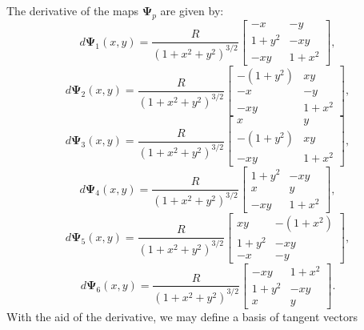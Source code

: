 The derivative of the maps $\boldsymbol{\Psi}_p$ are given by:
\begin{equation*}
	d\boldsymbol{\Psi}_{1}(x,y) = \frac{R}{{(1 + x^2 + y^2)}^{3/2}}
	\begin{bmatrix}
		-x & -y \\
	 	 1+y^2  & -xy \\
		 -xy  & 1+x^2
	\end{bmatrix},
\end{equation*}
\begin{equation*}
	d\boldsymbol{\Psi}_{2}(x,y) = \frac{R}{{(1 + x^2 + y^2)}^{3/2}}
	\begin{bmatrix}
		-(1+y^2) & xy \\
		 -x &  -y \\
		 -xy &  1+x^2
	\end{bmatrix},
\end{equation*}
\begin{equation*}
	d\boldsymbol{\Psi}_{3}(x,y) = \frac{R}{{(1 + x^2 + y^2)}^{3/2}}
	\begin{bmatrix}
		 x &  y \\
		-(1+y^2) & xy \\
		 -xy &  1+x^2
	\end{bmatrix},
\end{equation*}
\begin{equation*}
	d\boldsymbol{\Psi}_{4}(x,y) = \frac{R}{{(1 + x^2 + y^2)}^{3/2}}	
	\begin{bmatrix}
		 1+y^2 &  -xy \\
		 x & y \\
		 -xy &  1+x^2
	\end{bmatrix},
\end{equation*}
\begin{equation*}
	d\boldsymbol{\Psi}_{5}(x,y) = \frac{R}{{(1 + x^2 + y^2)}^{3/2}}	
	\begin{bmatrix}
		 xy  & -(1+x^2) \\
	 	 1+y^2  &  -xy \\
		-x & -y
	\end{bmatrix},
\end{equation*}
\begin{equation*}
	d\boldsymbol{\Psi}_{6}(x,y) = \frac{R}{{(1 + x^2 + y^2)}^{3/2}}
	\begin{bmatrix}
		 -xy  &  1+x^2 \\
		 1+y^2  &  -xy \\
		 x &  y
	\end{bmatrix}.
\end{equation*}
With the aid of the derivative, we may define a basis of tangent vectors 
